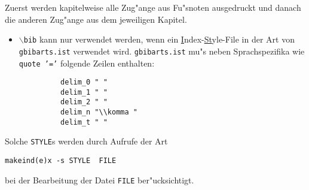 \documentclass[11pt]{article}                    %
\def\Befehl#1{{\tt$\backslash$#1}}
\def\Punkt#1{\begin{itemize}\item{#1}\end{itemize}}
\begin{document}
  \vspace{-2ex}

  \vspace{2ex}
  Zuerst werden kapitelweise alle Zug"ange aus Fu"snoten ausgedruckt und
  danach die anderen Zug"ange aus dem jeweiligen Kapitel.

  \vspace{-1ex}
  \Punkt{\Befehl{bib} kann nur verwendet werden, wenn ein
  \underline{I}ndex-\underline{St}yle-File in der Art von {\tt gbibarts.ist}
  verwendet wird. {\tt gbibarts.ist} mu"s neben Sprachspezifika wie {\tt
  quote~'='} folgende Zeilen enthalten:}

  \vspace{-3ex}
  \begin{verbatim}
             delim_0 " "
             delim_1 " "
             delim_2 " "
             delim_n "\\komma "
             delim_t " "
  \end{verbatim}

  \vspace{-3ex}
  \noindent
  Solche {\tt STYLE}s werden durch Aufrufe der Art

  \vspace{-1ex}
  \begin{center}{\tt makeind(e)x\/ -s\/ STYLE\, FILE}\end{center}

  \vspace{-1ex}
  \noindent
  bei der Bearbeitung der Datei {\tt FILE} ber"ucksichtigt.
\end{document}
